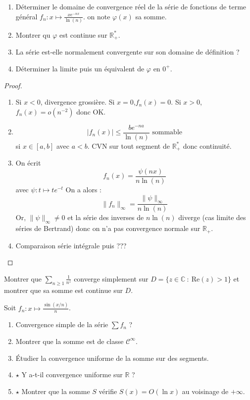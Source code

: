 \documentclass[french,a4paper]{article}
\newcommand{\R}{\mathbb{R}}
\newcommand{\C}{\mathbb{C}}
\newcommand{\st}{^*}
\theoremstyle{plain}
\theoremstyle{definition}
\theoremstyle{remark}
\begin{document}
\begin{ex}{}
	\begin{enumerate}
		\item Déterminer le domaine de convergence réel de la série de fonctions de terme général $f_n:x\mapsto\displaystyle\frac{xe^{-nx}}{\ln(n)}$. on note $\varphi(x)$ sa somme.
		\item Montrer qu $\varphi$ est continue sur $\R_+\st$.
		\item La série est-elle normalement convergente sur son domaine de définition ?
		\item Déterminer la limite puis un équivalent de $\varphi$ en $0^+$.
	\end{enumerate}
\end{ex}
\begin{proof}
	\begin{enumerate}
		\item Si $x<0$, divergence grossière. Si $x=0$,$f_n(x)=0$. Si $x>0$, $f_n(x)=o(n^{-2})$ donc OK.
		\item $$\lvert f_n(x)\rvert\leqslant \frac{be^{-na}}{\ln(n)}\text{ sommable}$$ si $x\in[a,b]$ avec $a<b$. CVN sur tout segment de $\R_+\st$ donc continuité.
		\item On écrit $$f_n(x)=\frac{\psi(nx)}{n\ln(n)}$$ avec $\psi:t\mapsto te^{-t}$ On a alors : $$\lVert f_n\rVert_\infty=\frac{\lVert\psi\rVert_\infty}{n\ln(n)}$$ Or, $\lVert\psi\rVert_\infty\ne0$ et la série des inverses de $n\ln(n)$ diverge (cas limite des séries de Bertrand) donc on n'a pas convergence normale sur $\R_+$.
		\item Comparaison série intégrale puis ???
	\end{enumerate}
\end{proof}

\begin{ex}{}
	Montrer que $\displaystyle\sum_{n\geqslant 1}\frac{1}{n^z}$ converge simplement sur $D=\{z\in\C\ : \ \text{Re}(z)>1\}$ et montrer que sa somme est continue sur $D$.
\end{ex}

\begin{ex}{}
	Soit $f_n:x\mapsto\displaystyle\frac{\sin(x/n)}{n}$.
	\begin{enumerate}
		\item Convergence simple de la série $\sum f_n$ ?
		\item Montrer que la somme est de classe $\mathcal{C}^\infty$.
		\item Étudier la convergence uniforme de la somme sur des segments.
		\item $\star$ Y a-t-il convergence uniforme sur $\R$ ?
		\item $\star$ Montrer que la somme $S$ vérifie $S(x)=O(\ln x)$ au voisinage de $+\infty$.
	\end{enumerate}
\end{ex}
\end{document}
